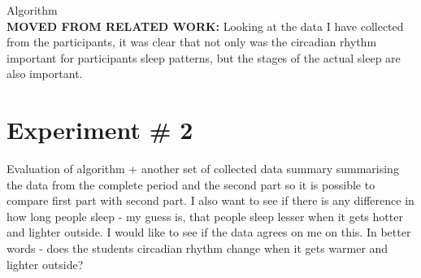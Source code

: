 \documentclass[12pt]{article} %
\begin{document}
Algorithm\\

\textbf{MOVED FROM RELATED WORK:}
Looking at the data I have collected from the participants, it was clear that not only was the circadian rhythm important for participants sleep patterns, but the stages of the actual sleep are also important. 





\section{Experiment \# 2}
Evaluation of algorithm + another set of collected data summary summarising the data from the complete period and the second part so it is possible to compare first part with second part. I also want to see if there is any difference in how long people sleep - my guess is, that people sleep lesser when it gets hotter and lighter outside. I would like to see if the data agrees on me on this. In better words - does the students circadian rhythm change when it gets warmer and lighter outside?



\end{document}
